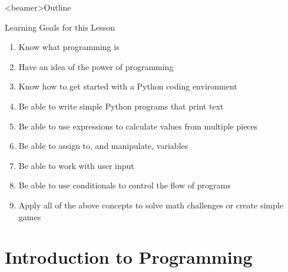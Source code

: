 \begin{frame}<beamer>{Outline}
%  
\tableofcontents
\end{frame}

\hypersetup{
  colorlinks=true,%
  citecolor=blue,%
  filecolor=blue,%
  linkcolor=blue,%
  urlcolor=blue,
}

\begin{frame}{Learning Goals for this Lesson}
  \begin{enumerate}
    \item Know what programming is
    \item Have an idea of the power of programming
    \item Know how to get started with a Python coding environment
    \item Be able to write simple Python programs that print text
    \item Be able to use expressions to calculate values from multiple pieces
    \item Be able to assign to, and manipulate, variables
    \item Be able to work with user input
    \item Be able to use conditionals to control the flow of programs
    \item Apply all of the above concepts to solve math challenges or create simple games
  \end{enumerate}
\end{frame}

\section{Introduction to Programming}

